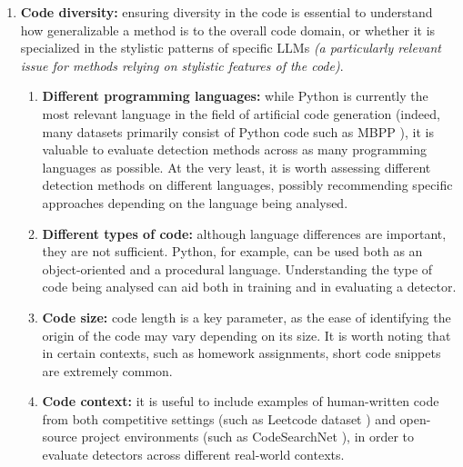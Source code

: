 \begin{enumerate}
    \item \textbf{Code diversity:} 
    ensuring diversity in the code is essential to understand 
    how generalizable a method is to the overall code domain, 
    or whether it is specialized in the stylistic patterns of 
    specific LLMs \textit{(a particularly relevant issue for methods relying 
    on stylistic features of the code)}.
        \begin{enumerate}
        \item \textbf{Different programming languages:}
        while Python is currently the most relevant language 
        in the field of artificial code generation (indeed, many 
        datasets primarily consist of Python code 
        such as MBPP \cite{austin2021program}), 
        it is valuable 
        to evaluate detection methods across as many programming 
        languages as possible. At the very least, it is worth 
        assessing different detection methods on different languages, 
        possibly recommending specific approaches depending 
        on the language being analysed.
        \item \textbf{Different types of code:}
        although language differences are important, 
        they are not sufficient. Python, for example, 
        can be used both as an object-oriented and a procedural 
        language. Understanding the type of code being analysed 
        can aid both in training and in evaluating a detector.
        \item \textbf{Code size:}
        code length is a key parameter, as the ease of identifying 
        the origin of the code may vary depending on its size. 
        It is worth noting that in certain contexts, such as homework 
        assignments, short code snippets are extremely common.
        \item \textbf{Code context:}
        it is useful to include examples 
        of human-written code from both competitive settings 
        (such as Leetcode dataset \cite{xia2025leetcodedataset}) 
        and open-source project environments 
        (such as CodeSearchNet \cite{husain2019codesearchnet}), 
        in order to evaluate detectors across different real-world contexts.
    \end{enumerate}


\end{enumerate}
